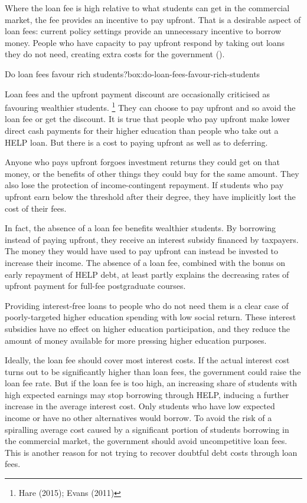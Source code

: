 \documentclass[embargoed]{grattan}
\begin{document}
Where the loan fee is high relative to what students can get in the commercial market, the fee provides an incentive to pay upfront.
That is a desirable aspect of loan fees: current policy settings provide an unnecessary incentive to borrow money.
People who have capacity to pay upfront respond by taking out loans they do not need, creating extra costs for the government ().

\begin{smallbox}{Do loan fees favour rich students?}{box:do-loan-fees-favour-rich-students}

Loan fees and the upfront payment discount are occasionally criticised as favouring wealthier students.%
\footnote{Hare (2015); Evans (2011)} They can choose to pay upfront and so avoid the loan fee or get the discount.
It is true that people who pay upfront make lower direct cash payments for their higher education than people who take out a \gls{HELP} loan.
But there is a cost to paying upfront as well as to deferring.

Anyone who pays upfront forgoes investment returns they could get on that money, or the benefits of other things they could buy for the same amount.
They also lose the protection of income-contingent repayment.
If students who pay upfront earn below the threshold after their degree, they have implicitly lost the cost of their fees.

In fact, the absence of a loan fee benefits wealthier students.
By borrowing instead of paying upfront, they receive an interest subsidy financed by taxpayers.
The money they would have used to pay upfront can instead be invested to increase their income.
The absence of a loan fee, combined with the bonus on early repayment of \gls{HELP} debt, at least partly explains the decreasing rates of upfront payment for full-fee postgraduate courses.

Providing interest-free loans to people who do not need them is a clear case of poorly-targeted higher education spending with low social return.
These interest subsidies have no effect on higher education participation, and they reduce the amount of money available for more pressing higher education purposes.
\end{smallbox}

Ideally, the loan fee should cover most interest costs.
If the actual interest cost turns out to be significantly higher than loan fees, the government could raise the loan fee rate.
But if the loan fee is too high, an increasing share of students with high expected earnings may stop borrowing through \gls{HELP}, inducing a further increase in the average interest cost.
Only students who have low expected income or have no other alternatives would borrow.
To avoid the risk of a spiralling average cost caused by a significant portion of students borrowing in the commercial market, the government should avoid uncompetitive loan fees.
This is another reason for not trying to recover doubtful debt costs through loan fees.
\end{document}
